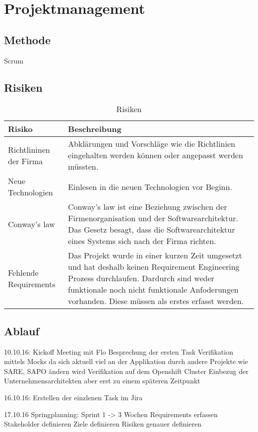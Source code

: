 \chapter{Projektmanagement}

\section{Methode}

Scrum

\section{Risiken}

\begin{table}[h!]
	\centering
	\caption{Risiken}
	\label{tab:table1}
	\begin{tabular}{ | p{2cm} | p{14cm} | }
		\toprule
		{\textbf{Risiko}} & {\textbf{Beschreibung}} \\
		\midrule
		Richtlininen der Firma & Abklärungen und Vorschläge wie die Richtlinien eingehalten werden können oder angepasst werden müssten. \\ \hline
		Neue Technologien & Einlesen in die neuen Technologien vor Beginn. \\ \hline
		Conway's law & Conway's law ist eine Beziehung zwischen der Firmenorganisation und der Softwarearchitektur. Das Gesetz besagt, dass die Softwarearchitektur eines Systems sich nach der Firma richten. \\ \hline
		Fehlende Requirements & Das Projekt wurde in einer kurzen Zeit umgesetzt und hat deshalb keinen Requirement Engineering Prozess durchlaufen. Dardurch sind weder funktionale noch nicht funktionale Anfoderungen vorhanden. Diese müssen als erstes erfasst werden. \\
		\bottomrule
	\end{tabular}
\end{table}

\section{Ablauf}

10.10.16:
Kickoff Meeting mit Flo
Besprechung der ersten Task
Verifikation mittels Mocks da sich aktuell viel an der Applikation durch andere Projekte wie SARE, SAPO ändern wird
Verifikation auf dem Openshift Cluster
Einbezug der Unternehmensarchitekten aber erst zu einem späteren Zeitpunkt

16.10.16:
Erstellen der einzlenen Task im Jira

17.10.16
Springplanning:
Sprint 1 -> 3 Wochen
Requirements erfassen
Stakeholder definieren
Ziele definieren
Risiken genauer definieren
 